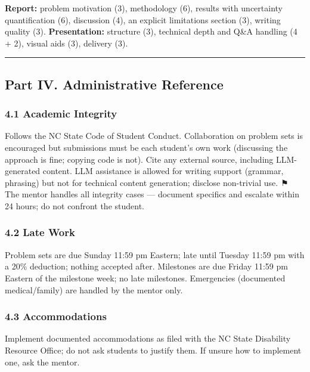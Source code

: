 \documentclass[
]{article}
\begin{document}
\textbf{Report:} problem motivation (3), methodology (6), results with
uncertainty quantification (6), discussion (4), an explicit limitations
section (3), writing quality (3). \textbf{Presentation:} structure (3),
technical depth and Q\&A handling (4 + 2), visual aids (3), delivery
(3).

\begin{center}\rule{0.5\linewidth}{0.5pt}\end{center}

\subsection{Part IV. Administrative
Reference}\label{part-iv.-administrative-reference}

\subsubsection{4.1 Academic Integrity}\label{academic-integrity}

Follows the NC State Code of Student Conduct. Collaboration on problem
sets is encouraged but submissions must be each student's own work
(discussing the approach is fine; copying code is not). Cite any
external source, including LLM-generated content. LLM assistance is
allowed for writing support (grammar, phrasing) but not for technical
content generation; disclose non-trivial use. ⚑ The mentor handles all
integrity cases --- document specifics and escalate within 24 hours; do
not confront the student.

\subsubsection{4.2 Late Work}\label{late-work}

Problem sets are due Sunday 11:59 pm Eastern; late until Tuesday 11:59
pm with a 20\% deduction; nothing accepted after. Milestones are due
Friday 11:59 pm Eastern of the milestone week; no late milestones.
Emergencies (documented medical/family) are handled by the mentor only.

\subsubsection{4.3 Accommodations}\label{accommodations}

Implement documented accommodations as filed with the NC State
Disability Resource Office; do not ask students to justify them. If
unsure how to implement one, ask the mentor.
\end{document}
